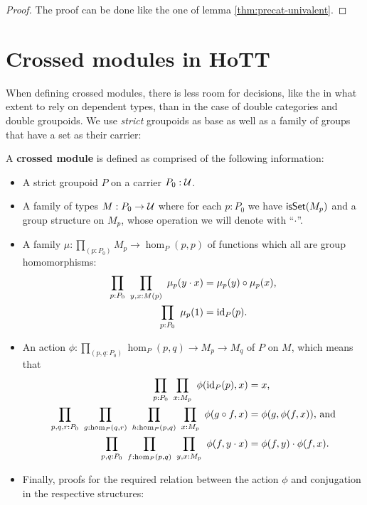 \begin{proof}
The proof can be done like the one of lemma \ref{thm:precat-univalent}.
\end{proof}


\section{Crossed modules in HoTT}

When defining crossed modules, there is less room for decisions, like the in what
extent to rely on dependent types, than in the case of double categories and
double groupoids.
We use \emph{strict} groupoids as base as well as a family of groups that have
a set as their carrier:

\begin{defn} \label{def:xmod-hott}
A \textbf{crossed module} is defined as comprised of the following information:
\begin{itemize}
\item A strict groupoid $P$ on a carrier $P_0 : \mathcal{U}$.
\item A family of types $M : P_0 \to \mathcal{U}$ where for each $p : P_0$ we have
$\mathsf{isSet}(M_p)$ and a group structure on $M_p$, whose operation we will denote with
``$\cdot$''.
\item A family $\mu : \prod_{(p:P_0)} M_p \to \hom_P(p,p)$ of functions which all
are group homomorphisms:
\begin{align*}
\prod_{p:P_0} ~ \prod_{y,x:M(p)} ~ \mu_p(y \cdot x) &= \mu_p(y) \circ \mu_p(x) \text{,} \\
\prod_{p:P_0} ~ \mu_p(1) &= \operatorname{id}_P(p) \text{.}
\end{align*}
\item An action $\phi : \prod_{(p,q:P_0)} \hom_P(p,q) \to M_p \to M_q$ of $P$ on
$M$, which means that
\begin{align*}
\prod_{p:P_0} ~ \prod_{x:M_p} ~ \phi(\operatorname{id}_P(p),x) &= x \text{,} \\
\prod_{p,q,r:P_0} ~ \prod_{g:\hom_P(q,r)} ~ \prod_{h:\hom_P(p,q)} ~ \prod_{x:M_p} ~
	\phi(g \circ f,x) &= \phi(g,\phi(f,x)) \text{, and} \\
\prod_{p,q:P_0} ~ \prod_{f:\hom_P(p,q)} ~ \prod_{y,x:M_p} ~
	\phi(f,y \cdot x) &= \phi(f,y) \cdot \phi(f,x) \text{.}
\end{align*}
\item Finally, proofs for the required relation between the action $\phi$ and
conjugation in the respective structures:

\end{itemize}
\end{defn}

